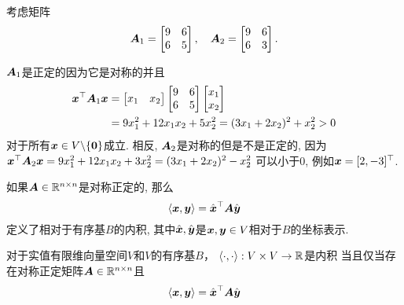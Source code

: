 \begin{example}[对称正定矩阵]
     考虑矩阵
     \begin{equation}
         \boldsymbol{A}_1 =
         \begin{bmatrix}
             9 & 6 \\
             6 & 5
         \end{bmatrix},\quad
         \boldsymbol{A}_2 =
         \begin{bmatrix}
             9 & 6 \\
             6 & 3
         \end{bmatrix}.
     \end{equation}
\end{example}
$\boldsymbol{A}_1$是正定的因为它是对称的并且
\begin{subequations}
    \begin{align}
    \boldsymbol{x}^\top \boldsymbol{A}_1 \boldsymbol{x} &=
    \begin{bmatrix}
        x_1 & x_2
    \end{bmatrix}
    \begin{bmatrix}
        9 & 6 \\
        6 & 5
    \end{bmatrix}
    \begin{bmatrix}
        x_1 \\
        x_2
    \end{bmatrix} \\
    &= 9x^2_1 + 12x_1x_2 + 5x^2_2 = (3x_1 + 2x_2)^2 + x^2_2 > 0
    \end{align}
\end{subequations}
对于所有$\boldsymbol{x} \in V\backslash\{\boldsymbol{0}\}$成立.
相反, $\boldsymbol{A}_2$是对称的但是不是正定的,
因为$\boldsymbol{x}^\top\boldsymbol{A}_2\boldsymbol{x}= 9x^2_1 + 12x_1x_2 + 3x^2_2 = (3x_1 + 2x_2)^2 - x^2_2$
可以小于0, 例如$\boldsymbol{x} = [2,-3]^\top$.

如果$\boldsymbol{A} \in \mathbb{R}^{n\times n}$是对称正定的, 那么
\begin{equation}
    \langle\boldsymbol{x},\boldsymbol{y}\rangle = \hat{\boldsymbol{x}}^\top \boldsymbol{A} \hat{\boldsymbol{y}}
\end{equation}
定义了相对于有序基$B$的内积, 其中$\hat{\boldsymbol{x}},\hat{\boldsymbol{y}}$是$\boldsymbol{x},\boldsymbol{y} \in V$相对于$B$的坐标表示.

\begin{theorem}
    对于实值有限维向量空间$V$和$V$的有序基$B$，
    $\langle\cdot,\cdot\rangle: V \times V \rightarrow \mathbb{R}$是内积
    当且仅当存在对称正定矩阵$\boldsymbol{A} \in \mathbb{R}^{n\times n}$且
    \begin{equation}
        \langle\boldsymbol{x},\boldsymbol{y}\rangle = \hat{\boldsymbol{x}}^\top \boldsymbol{A} \hat{\boldsymbol{y}}
    \end{equation}
\end{theorem}

